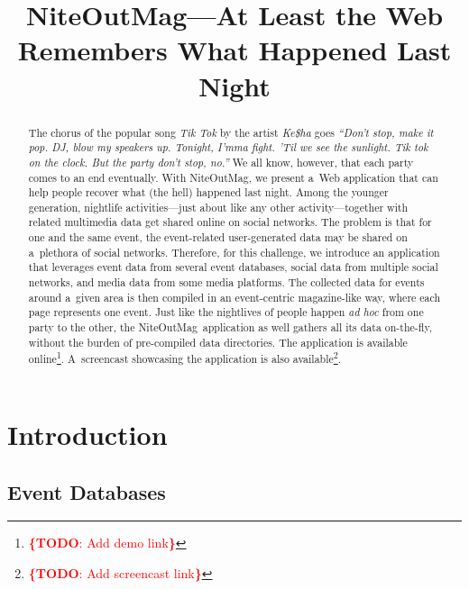 \documentclass{acm_proc_article-sp}
\let\oldemph\emph
\renewcommand{\emph}[1]{\oldemph{\fontsize{9}{9}\selectfont #1}}
\newcommand{\todo}[1]{\noindent\textcolor{red}{{\bf \{TODO}: #1{\bf \}}}}
\begin{document}
\title{NiteOutMag{\Large \textbf{\textsuperscript{\texttrademark}}}---At Least the Web\\ Remembers What Happened Last Night}

\author{
}
\maketitle

\begin{abstract}
The chorus of the popular song \emph{Tik Tok} by the artist \emph{Ke\$ha} goes
\emph{``Don't stop, make it pop. DJ, blow my speakers up. Tonight, I'mma fight.
'Til we see the sunlight. Tik tok on the clock. But the party don't stop, no.''}
We all know, however, that each party comes to an end eventually.
With NiteOutMag\texttrademark, we present a~Web application
that can help people recover what (the hell) happened last night.
Among the younger generation, nightlife activities---just about like any other
activity---together with related multimedia data get shared online on social networks.
The problem is that for one and the same event, the event-related user-generated data
may be shared on a~plethora of social networks.
Therefore, for this challenge, we introduce an application
that leverages event data from several event databases,
social data from multiple social networks, and media data from some media platforms.
The collected data for events around a~given area is then compiled
in an event-centric magazine-like way, where each page represents one event.
Just like the nightlives of people happen \emph{ad hoc} from one party to the other,
the NiteOutMag\texttrademark~application as well
gathers all its data on-the-fly, without the burden of pre-compiled data directories.
The application is available online\footnote{\todo{Add demo link}}.
A~screencast showcasing the application is also available\footnote{\todo{Add screencast link}}.
\end{abstract}




\section{Introduction}

\subsection{Event Databases}
\end{document}
